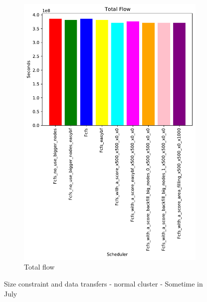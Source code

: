 \documentclass[a4paper]{article}
\begin{document}
\begin{figure}[H]
\begin{subfigure}[b]{0.4\linewidth}\centering\includegraphics[width=1\linewidth]{MBSS/plot/Results_Size_And_Data_2022-01-24->2022-01-24_Total_flow_450_128_32_256_4_1024.pdf}\caption{Total flow}\label{20}\end{subfigure}
\caption{Size constraint and data transfers - normal cluster - Sometime in July}\label{21}\end{figure}
\end{document}
